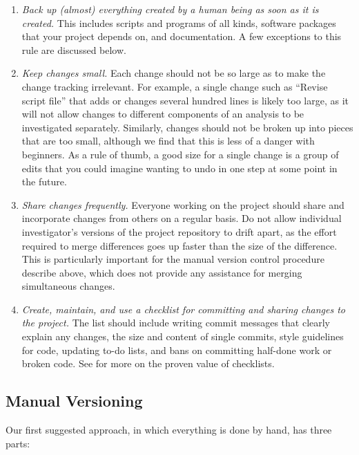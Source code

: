 \documentclass[10pt]{article}
\newcommand{\recommend}[1]{\textit{#1}}
\begin{document}
\begin{enumerate}

\item
  \recommend{Back up (almost) everything created by a human being as
    soon as it is created.} This includes scripts and programs of all
  kinds, software packages that your project depends on, and
  documentation. A few exceptions to this rule are discussed below.

\item
  \recommend{Keep changes small.}  Each change should not be so large
  as to make the change tracking irrelevant. For example, a single
  change such as ``Revise script file'' that adds or changes several
  hundred lines is likely too large, as it will not allow changes to
  different components of an analysis to be investigated
  separately. Similarly, changes should not be broken up into pieces
  that are too small, although we find that this is less of a danger
  with beginners. As a rule of thumb, a good size for a single change is
  a group of edits that you could imagine wanting to undo in one step
  at some point in the future.

\item
  \recommend{Share changes frequently.} Everyone working on the
  project should share and incorporate changes from others on a
  regular basis.  Do not allow individual investigator's versions of
  the project repository to drift apart, as the effort required to
  merge differences goes up faster than the size of the
  difference. This is particularly important for the manual version
  control procedure describe above, which does not provide any
  assistance for merging simultaneous changes.

\item
  \recommend{Create, maintain, and use a checklist for committing and
    sharing changes to the project.}  The list should include writing
  commit messages that clearly explain any changes, the size and
  content of single commits, style guidelines for code, updating to-do
  lists, and bans on committing half-done work or broken code.  See
  \cite{gawande2011} for more on the proven value of checklists.

\end{enumerate}

\subsection*{Manual Versioning}

Our first suggested approach, in which everything is done by hand, has
three parts:
\end{document}
